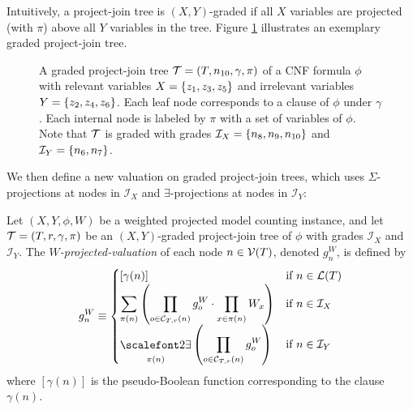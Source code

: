 Intuitively, a project-join tree is $(X,Y)$-graded if all $X$ variables are projected (with $\pi$) above all $Y$ variables in the tree. Figure \ref{tree_ex} illustrates an exemplary graded project-join tree.
\begin{figure}[t]
    \centering
    \caption{
        A graded project-join tree $\mathcal{T} = (T, n_{10}, \gamma, \pi)$ of a CNF formula $\phi$ with relevant variables $X = \left\{ z_1, z_3, z_5 \right\}$ and irrelevant variables $Y = \left\{ z_2, z_4, z_6 \right\}$.
        Each leaf node corresponds to a clause of $\phi$ under $\gamma$.
        Each internal node is labeled by $\pi$ with a set of variables of $\phi$.
        Note that $\mathcal{T}$ is graded with grades $\mathcal{I}_X = \left\{ n_8, n_9, n_{10} \right\}$ and $\mathcal{I}_Y = \left\{ n_6, n_7 \right\}$.
    }
    \label{tree_ex}
\end{figure}

We then define a new valuation on graded project-join trees, which uses $\Sigma$-projections at nodes in $\mathcal{I}_X$ and $\exists$-projections at nodes in $\mathcal{I}_Y$:
\begin{definition}
    \label{def:graded_valuation}
    Let $(X, Y, \phi, W)$ be a weighted projected model counting instance, and let $\mathcal{T} = (T, r, \gamma, \pi)$ be an $(X,Y)$-graded project-join tree of $\phi$ with grades $\mathcal{I}_X$ and $\mathcal{I}_Y$.
    The \emph{$W$-projected-valuation} of each node $n \in \mathcal{V}(T)$, denoted $g^W_n$, is defined by
    \begin{align*}
        g^W_n \equiv
        \begin{cases}
            [\gamma(n)] & \text{if } n \in \Lv{T} \\
            \displaystyle\sum_{\pi(n)} \pars{ \prod_{o \in \C T r n} g^W_o \cdot \prod_{x \in \pi(n)} W_x } & \text{if } n \in \mathcal{I}_X \\
            \displaystyle\exist_{\pi(n)} \pars{ \prod_{o \in \C T r n} g^W_o } & \text{if } n \in \mathcal{I}_Y
        \end{cases}
    \end{align*}
    where $[\gamma(n)]$ is the pseudo-Boolean function corresponding to the clause $\gamma(n)$.
\end{definition}

